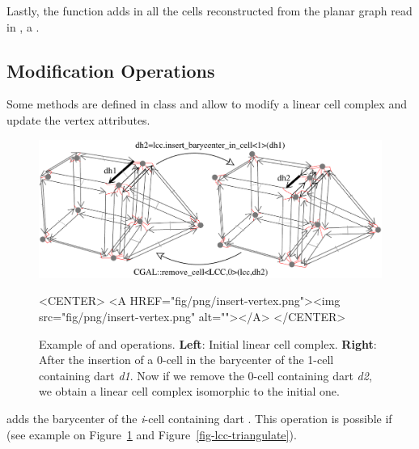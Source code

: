 Lastly, the function  adds in
 all the cells reconstructed from the planar graph read in
, a .

\subsection{Modification Operations}\label{ssec-modif-op}

Some methods are defined in  class and allow
to modify a linear cell complex and update the vertex attributes.  

\begin{figure}[htb]
  \begin{ccTexOnly}
    \begin{center}
      \includegraphics[width=.75\textwidth]{Linear_cell_complex/fig/pdf/insert-vertex}
    \end{center}
  \end{ccTexOnly}
  \begin{ccHtmlOnly}
    <CENTER> <A HREF="fig/png/insert-vertex.png"><img
    src="fig/png/insert-vertex.png" alt=""></A> </CENTER>
  \end{ccHtmlOnly}
  \caption{Example of  and
     operations. \textbf{Left}: Initial linear
    cell complex.  \textbf{Right}: After the insertion of a 0-cell in
    the barycenter of the 1-cell containing dart \emph{d1}.  Now if we
    remove the 0-cell containing dart \emph{d2}, we obtain a linear
    cell complex isomorphic to the initial one.}
  \label{fig-lcc-insert-vertex}
\end{figure}

 adds the
barycenter of the \emph{i}-cell containing dart . This
operation is possible if \myin{} (see example
on Figure~\ref{fig-lcc-insert-vertex} and
Figure~\ref{fig-lcc-triangulate}).

